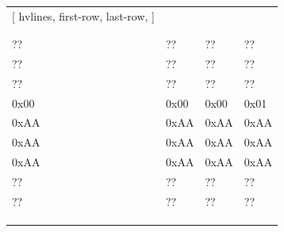 \documentclass{article}
\begin{document}
 	\begin{minipage}{.4\textwidth}
 		\footnotesize
 		\begin{center}
 			\setlength{\extrarowheight}{5mm}
 			\begin{NiceTabular}{*{4}{X[c]}}[
 				hvlines,
 				first-row,
 				last-row,
 				]
 				 & & & \\[0.5cm]
 				 & & & \\
 				& & & \\
 				?? & ?? & ?? & ?? \\
 				?? & ?? & ?? & ?? \\
 				?? & ?? & ?? & ?? \\
 				0x00 & 0x00 & 0x00 & 0x01 \\
 				0xAA & 0xAA & 0xAA & 0xAA \\
 				0xAA & 0xAA & 0xAA & 0xAA \\
 				0xAA & 0xAA & 0xAA & 0xAA \\
 				?? & ?? & ?? & ?? \\
 				?? & ?? & ?? & ?? \\
 				 & & & \\
 				& & & \\
 				 & & & \\[0.5cm]
 			\end{NiceTabular}
 		\end{center}
 	\end{minipage}
 
\end{document}
